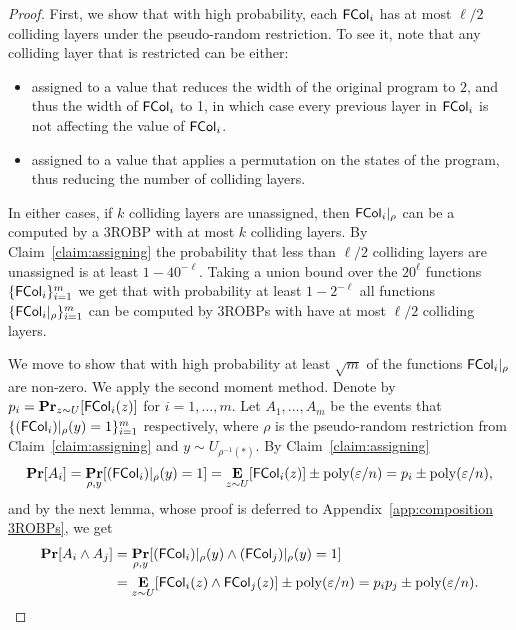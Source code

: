 \begin{proof}

	First, we show that with high probability, each ${\mathsf{FCol}}_i$ has at most $\ell/2$ colliding layers under the pseudo-random restriction. 
	To see it, note that any colliding layer that is restricted can be either:
	\begin{itemize}
		\item assigned to a value that reduces the width of the original program to $2$, and thus the width of ${\mathsf{FCol}}_i$ to 1, in which case every previous layer in ${\mathsf{FCol}}_i$ is not affecting the value of ${\mathsf{FCol}}_i$.
		\item assigned to a value that applies a permutation on the states of the program, thus reducing the number of colliding layers.
	\end{itemize}  
	In either cases, if $k$ colliding layers are unassigned, then ${\mathsf{FCol}}_i|_{\rho}$ can be a computed by a 3ROBP with at most $k$ colliding layers.
	By Claim~\ref{claim:assigning} the probability that less than $\ell/2$ colliding layers are unassigned is at least $1-40^{-\ell}$.
	Taking a union bound over the $20^{\ell}$ functions $\{{\mathsf{FCol}}_i\}_{i=1}^{m}$ we get that with probability at least $1-2^{-\ell}$ all functions $\{{\mathsf{FCol}}_i|_{\rho}\}_{i=1}^{m}$ can be computed by 3ROBPs with have at most $\ell/2$ colliding layers.
	
	We move to show that with high probability at least $\sqrt{m}$ of the functions ${\mathsf{FCol}}_i|_{\rho}$ are non-zero.
	We apply the second moment method. 
	Denote by $p_i = \mathop{\bf Pr\/}_{z\sim U}[{\mathsf{FCol}}_i(z)]$ for $i=1, \ldots, m$.
	Let $A_1, \ldots, A_m$ be the events that $\{({\mathsf{FCol}}_i)|_{\rho}(y) =1\}_{i=1}^{m}$ respectively, where $\rho$ is the pseudo-random restriction from Claim~\ref{claim:assigning} and $y \sim U_{\rho^{-1}(*)}$.
	By Claim~\ref{claim:assigning}
	$$\mathop{\bf Pr\/}[A_i] = \mathop{\bf Pr\/}_{\rho,y}[({\mathsf{FCol}}_i)|_{\rho}(y) =1] = \mathop{\bf E\/}_{z\sim U}[{\mathsf{FCol}}_i(z)] \pm {\mathrm{poly}}(\varepsilon/n) = p_i \pm {\mathrm{poly}}(\varepsilon/n),$$
	and by the next lemma, whose proof is deferred to Appendix~\ref{app:composition 3ROBPs}, we get
	\begin{align*}\mathop{\bf Pr\/}[A_i \wedge A_j] &= \mathop{\bf Pr\/}_{\rho,y}[({\mathsf{FCol}}_i)|_{\rho}(y) \wedge ({\mathsf{FCol}}_j)|_{\rho}(y) =1]\\
	&= \mathop{\bf E\/}_{z\sim U}[{\mathsf{FCol}}_i(z)\wedge {\mathsf{FCol}}_j(z)] \pm {\mathrm{poly}}(\varepsilon/n) = p_i p_j \pm {\mathrm{poly}}(\varepsilon/n).
	\end{align*}	


\end{proof}

